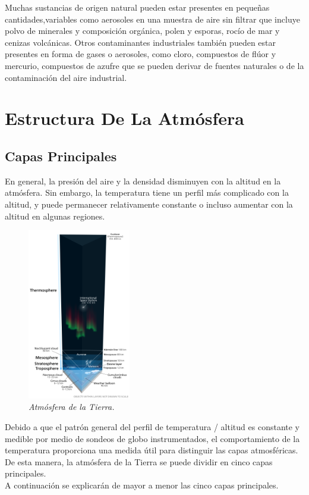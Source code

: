 \documentclass[12pt]{article}
\begin{document}
    Muchas sustancias de origen natural pueden estar presentes en pequeñas cantidades,variables como aerosoles en una muestra de aire sin filtrar que incluye polvo de minerales y composición orgánica, polen y esporas, rocío de mar y cenizas volcánicas. Otros contaminantes industriales también pueden estar presentes en forma de gases o aerosoles, como cloro, compuestos de flúor y mercurio, compuestos de azufre que se pueden derivar de fuentes naturales o de la contaminación del aire industrial.\\
    
    
    
\section{Estructura De La Atmósfera}

\subsection{Capas Principales}
	En general, la presión del aire y la densidad disminuyen con la altitud en la atmósfera. Sin embargo, la temperatura tiene un perfil más complicado con la altitud, y puede permanecer relativamente constante o incluso aumentar con la altitud en algunas regiones. 
   
\begin{figure} 
\includegraphics[width=0.4\textwidth]{Capas.png}
\caption{\textit{Atmósfera de la Tierra.}}
\end{figure}
   
    Debido a que el patrón general del perfil de temperatura / altitud es constante y medible por medio de sondeos de globo instrumentados, el comportamiento de la temperatura proporciona una medida útil para distinguir las capas atmosféricas. De esta manera, la atmósfera de la Tierra se puede dividir en cinco capas principales. \\
A continuación se explicarán de mayor a menor las cinco capas principales.
\end{document}
